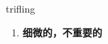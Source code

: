 
\begin{frame}
{\huge trifling}
\begin{center}
\begin{enumerate}\Large
  \item \textbf{细微的，不重要的}
\end{enumerate}
\end{center}
\end{frame}

